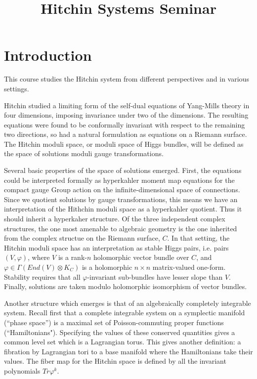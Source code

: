 \documentclass[oneside,english]{amsbook}
\numberwithin{section}{chapter}
\numberwithin{equation}{section}
\numberwithin{figure}{section}
\theoremstyle{plain}
\theoremstyle{definition}
\theoremstyle{remark}
\theoremstyle{definition}
\theoremstyle{definition}
\theoremstyle{plain}
\begin{document}
\title{Hitchin Systems Seminar}

\maketitle
\tableofcontents{}


\chapter{Introduction}

This course studies the Hitchin system from different perspectives and in various settings.

Hitchin studied a limiting form of the self-dual equations of Yang-Mills theory in four dimensions,
imposing invariance under two of the dimensions.  The resulting equations were found to be
conformally invariant with respect to the remaining two directions, so had a natural formulation
as equations on a Riemann surface.  The Hitchin moduli space, or moduli space of Higgs bundles,
will be defined as the space of solutions moduli gauge transformations.

Several basic properties of the space of solutions emerged.  First, the equations could be
interpreted formally as hyperkahler moment map equations for the compact gauge Group action
on the infinite-dimensional space of connections.  Since we quotient solutions by gauge
transformations, this means we have an interpretation of the Hithchin moduli space as a hyperkahler
quotient.  Thus it should inherit a hyperkaher structure.  Of the three independent complex structures,
the one most amenable to algebraic geometry is the one inherited from the complex
structue on the Riemann surface, $C$.  In that setting, the Hitchin moduli space has an
interpretation as stable Higgs pairs, i.e. pairs $(V,\varphi)$, where $V$ is a rank-$n$ holomorphic
vector bundle over $C$, and $\varphi\in \Gamma(End(V)\otimes K_C)$ is a holomorphic $n\times n$
matrix-valued one-form.  Stability requires that all $\varphi$-invariant sub-bundles have lesser slope
than $V$.  Finally, solutions are taken modulo holomorphic isomorphism of vector bundles.

Another structure which emerges is that of an algebraically completely integrable system.
Recall first that a complete integrable system on a symplectic manifold (``phase space'') is a
maximal set of Poisson-commuting proper functions (``Hamiltonians").  Specifying the values
of these conserved quantities gives a common level set which is a Lagrangian torus.
This gives another definition:  a fibration by Lagrangian tori to a base manifold where the
Hamiltonians take their values.  The fiber map for the Hitchin space is defined by all the
invariant polynomials $Tr\varphi^k$.
\end{document}
